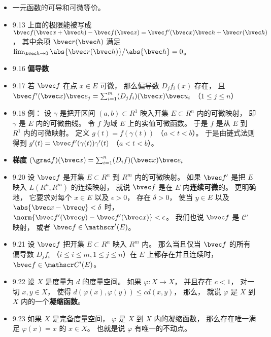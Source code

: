 \begin{itemize}
\item 一元函数的可导和可微等价。

\item 9.13 上面的极限能被写成 $\bvec f(\bvec x+\bvec h) - \bvec f(\bvec x) = \bvec f'(\bvec x)\bvec h + \bvec r(\bvec h)$， 其中余项 $\bvec r(\bvec h)$ 满足 $\lim_{\bvec h\to0} \abs{\bvec r(\bvec h)}/\abs{\bvec h} = 0$。

\item 9.16 \textbf{偏导数}

\item 9.17 若 $\bvec f$ 在点 $x\in E$ 可微， 那么偏导数 $D_jf_i(x)$ 存在， 且 $\bvec f'(\bvec x)\bvec e_j = \sum_{i=1}^m (D_jf_i)(\bvec x)\bvec u_i$ （$1\leqslant j\leqslant n$）

\item 9.18 例： 设 $\gamma$ 是把开区间 $(a,b)\subset R^1$ 映入开集 $E\subset R^n$ 内的可微映射， 即 $\gamma$ 是 $E$ 内的可微曲线。 令 $f$ 为域 $E$ 上的实值可微函数。 于是 $f$ 是从 $E$ 到 $R^1$ 内的可微映射。 定义 $g(t) = f(\gamma(t))$ （$a< t<b$）。 于是由链式法则得到 $g'(t) = \bvec f'(\gamma(t))\gamma'(t)$ （$a<t<b$）。

\item \textbf{梯度} $(\grad f)(\bvec x) = \sum_{i=1}^n (D_i f)(\bvec x)\bvec e_i$

\item 9.20 设 $\bvec f$ 是开集 $E\subset R^n$ 到 $R^m$ 内的可微映射。 如果 $\bvec f'$ 是把 $E$ 映入 $L(R^n,R^m)$ 的连续映射， 就说 $\bvec f$ 是在 $E$ 内\textbf{连续可微}的。 更明确地， 它要求对每个 $x\in E$ 以及 $\epsilon > 0$， 存在 $\delta >0$， 使当 $y\in E$ 以及 $\abs{\bvec x-\bvec y}<\delta$ 时， $\norm{\bvec f'(\bvec y)-\bvec f'(\bvec x)} < \epsilon$。 我们也说 $\bvec f$ 是 $\mathscr C'$ 映射， 或者 $\bvec f\in \mathscr'(E)$。

\item 9.21 设 $\bvec f$ 把开集 $E\subset R^n$ 映入 $R^m$ 内。 那么当且仅当 $\bvec f$ 的所有偏导数 $D_jf_i$ （$i\leqslant i\leqslant m, 1\leqslant j\leqslant n$）在 $E$ 上都存在并且连续时， $\bvec f\in \mathscr C'(E)$。

\item 9.22 设 $X$ 是度量为 $d$ 的度量空间。 如果 $\varphi:X\to X$， 并且存在 $c<1$， 对一切 $x,y\in X$， 使得 $d(\varphi(x),\varphi(y))\leqslant cd(x,y)$， 那么， 就说 $\varphi$ 是 $X$ 到 $X$ 内的一个\textbf{凝缩函数}。

\item 9.23 如果 $X$ 是完备度量空间， $\varphi$ 是 $X$ 到 $X$ 内的凝缩函数， 那么存在唯一满足 $\varphi(x)=x$ 的 $x\in X$。 也就是说 $\varphi$ 有唯一的不动点。


\end{itemize}
